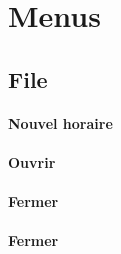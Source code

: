 \section{Menus}

\subsection{File}

\paragraph{Nouvel horaire}

\paragraph{Ouvrir}

\paragraph{Fermer}

\paragraph{Fermer}
